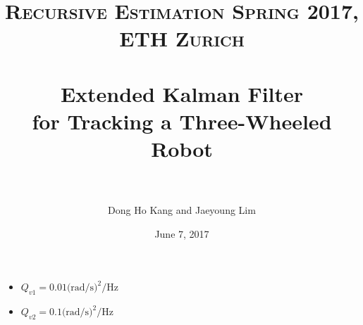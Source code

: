 \documentclass[paper=a4, margin=10mm, fontsize=11pt]{scrartcl} %
\title{	
\normalfont \normalsize 
\textsc{Recursive Estimation Spring 2017, ETH Zurich} \\ [25pt] %
\horrule{0.5pt} \\[0.4cm] %
\huge Extended Kalman Filter \\ for Tracking a Three-Wheeled Robot \\ %
\horrule{2pt} \\[0.5cm] %
}
\author{Dong Ho Kang and Jaeyoung Lim} %
\date{\normalsize June 7, 2017} %
\numberwithin{equation}{section} %
\numberwithin{figure}{section} %
\numberwithin{table}{section} %
\begin{document}
\maketitle %


\graphicspath{{figures/}} 

\begin{itemize}
	\item $Q_{v1} = 0.01 \text{(rad/s)}^2/\text{Hz}$

\begin{figure}[H]
\centering
\noindent{}
\end{figure}
	
	\item $Q_{v2} = 0.1 \text{(rad/s)}^2/\text{Hz}$

\begin{figure}[H]
\centering
\noindent{}
\end{figure}
	

\end{itemize}
\end{document}
